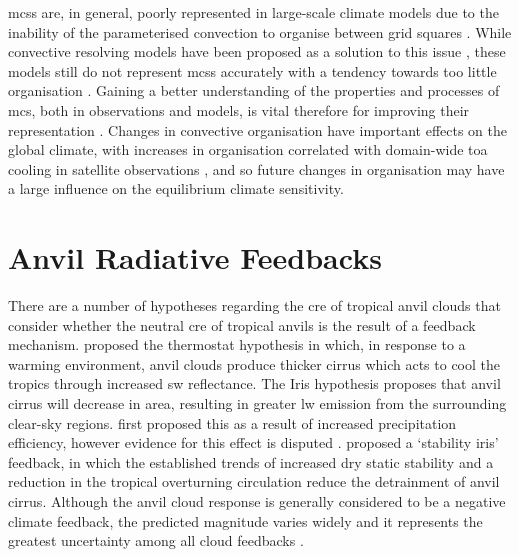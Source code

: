 \acrshort{mcs}s are, in general, poorly represented in large-scale climate models due to the inability of the parameterised convection to organise between grid squares \citep{houze_100_2018}.
While convective resolving models have been proposed as a solution to this issue \citep{stevens_added_2020}, these models still do not represent \acrshort{mcs}s accurately with a tendency towards too little organisation \citep{prein_sensitivity_2021}.
Gaining a better understanding of the properties and processes of \acrshort{mcs}, both in observations and models, is vital therefore for improving their representation \citep{feng_mesoscale_2023}.
Changes in convective organisation have important effects on the global climate, with increases in organisation correlated with domain-wide \acrshort{toa} cooling in satellite observations \citep{bony_observed_2020}, and so future changes in organisation may have a large influence on the equilibrium climate sensitivity.


\section{Anvil Radiative Feedbacks} \label{sec:anvil_feedbacks}

There are a number of hypotheses regarding the \acrshort{cre} of tropical anvil clouds that consider whether the neutral \acrshort{cre} of tropical anvils is the result of a feedback mechanism. 
\citet{ramanathan_cloud-radiative_1989} proposed the thermostat hypothesis in which, in response to a warming environment, anvil clouds produce thicker cirrus which acts to cool the tropics through increased \acrshort{sw} reflectance. 
The Iris hypothesis proposes that anvil cirrus will decrease in area, resulting in greater \acrshort{lw} emission from the surrounding clear-sky regions.
\citet{lindzen_does_2001} first proposed this as a result of increased precipitation efficiency, however evidence for this effect is disputed \citep{genio_climatic_2002, lin_examination_2004}.
\citet{bony_thermodynamic_2016} proposed a `stability iris' feedback, in which the established trends of increased dry static stability \citep{held_robust_2006} and a reduction in the tropical overturning circulation \citep{vecchi_global_2007} reduce the detrainment of anvil cirrus.
Although the anvil cloud response is generally considered to be a negative climate feedback, the predicted magnitude varies widely and it represents the greatest uncertainty among all cloud feedbacks \citep{sherwood_assessment_2020}.

